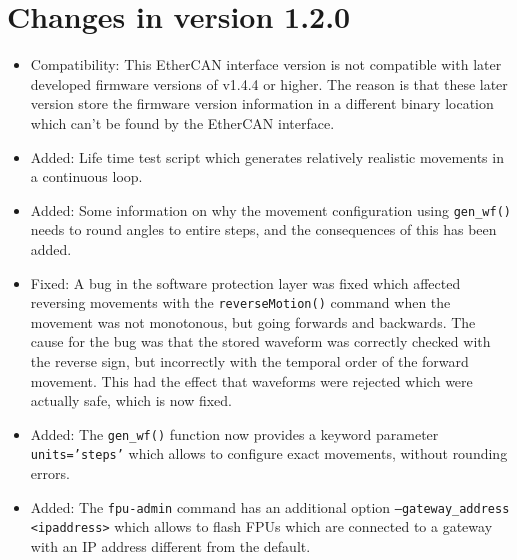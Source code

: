 \documentclass[fontsize=12,a4paper]{scrreprt}
\begin{document}
\section*{Changes in version 1.2.0}
\begin{itemize}
\item Compatibility: This EtherCAN interface version is not compatible with later
  developed firmware versions of v1.4.4 or higher. The reason is that
  these later version store the firmware version information in a
  different binary location which can't be found by the EtherCAN interface.

\item Added: Life time test script which generates relatively
  realistic movements in a continuous loop.

\item Added: Some information on why the movement configuration using
  \texttt{gen\_wf()} needs to round angles to entire steps, and the
  consequences of this has been added.

\item Fixed: A bug in the software protection layer was fixed which
  affected reversing movements with the \texttt{reverseMotion()}
  command when the movement was not monotonous, but going forwards and
  backwards. The cause for the bug was that the stored waveform was
  correctly checked with the reverse sign, but incorrectly with the
  temporal order of the forward movement. This had the effect that
  waveforms were rejected which were actually safe, which is now
  fixed.

\item Added: The \texttt{gen\_wf()} function now provides a keyword
  parameter \texttt{units='steps'} which allows to configure exact
  movements, without rounding errors.

\item Added: The \texttt{fpu-admin} command has an additional option
  \texttt{--gateway\_address <ipaddress>} which allows to flash
  FPUs which are connected to a gateway with an IP address different
  from the default.


\end{itemize}
\end{document}

